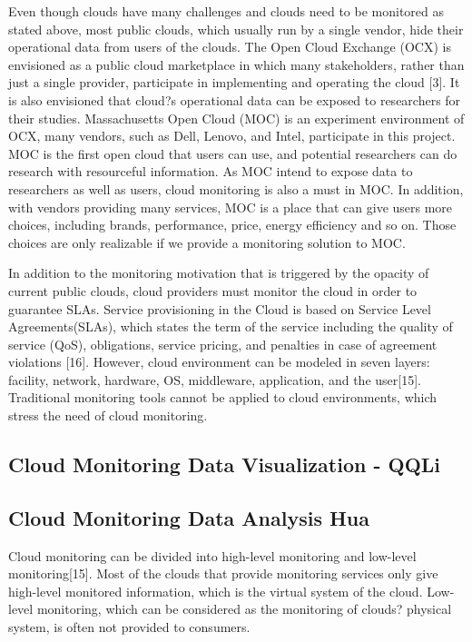   Even though clouds have many challenges and clouds need to be monitored as stated above, most public clouds, which usually run by a single vendor, hide their operational data from users of the clouds. The Open Cloud Exchange (OCX) is envisioned as a public cloud marketplace in which many stakeholders, rather than just a single provider, participate in implementing and operating the cloud [3]. It is also envisioned that cloud?s operational data can be exposed to researchers for their studies. Massachusetts Open Cloud (MOC) is an experiment environment of OCX, many vendors, such as Dell, Lenovo, and Intel, participate in this project. MOC is the first open cloud that users can use, and potential researchers can do research with resourceful information. As MOC intend to expose data to researchers as well as users, cloud monitoring is also a must in MOC. In addition, with vendors providing many services, MOC is a place that can give users more choices, including brands, performance, price, energy efficiency and so on. Those choices are only realizable if we provide a monitoring solution to MOC. 

  In addition to the monitoring motivation that is triggered by the opacity of current public clouds, cloud providers must monitor the cloud in order to guarantee SLAs. Service provisioning in the Cloud is based on Service Level Agreements(SLAs), which states the term of the service including the quality of service (QoS), obligations, service pricing, and penalties in case of agreement violations [16]. However, cloud environment can be modeled in seven layers: facility, network, hardware, OS, middleware, application, and the user[15]. Traditional monitoring tools cannot be applied to cloud environments, which stress the need of cloud monitoring.

\subsection{Cloud Monitoring Data Visualization - QQLi} 

\subsection{Cloud Monitoring Data Analysis Hua}

  Cloud monitoring can be divided into high-level monitoring and low-level monitoring[15]. Most of the clouds that provide monitoring services only give high-level monitored information, which is the virtual system of the cloud. Low-level monitoring, which can be considered as the monitoring of clouds? physical system, is often not provided to consumers. 

